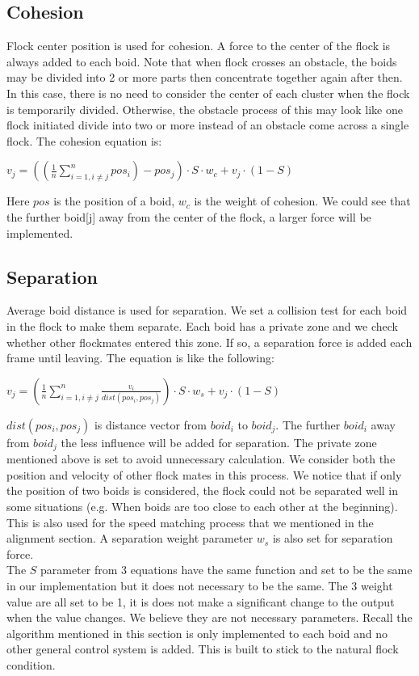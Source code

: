 \subsection{Cohesion}
Flock center position is used for cohesion. A force to the center of the flock is always added to each boid. Note that when flock crosses an obstacle, the boids may be divided into 2 or more parts then concentrate together again after then. In this case, there is no need to consider the center of each cluster when the flock is temporarily divided. Otherwise, the obstacle process of this may look like one flock initiated divide into two or more instead of an obstacle come across a single flock. The cohesion equation is:
\vspace{3mm}
\begin{center}
$v_j = ((\frac{1}{n}\sum_{i=1,i\neq{j}}^{n}{pos_i})-pos_j)\cdot S \cdot w_c + v_j \cdot (1-S)$
\end{center}
\vspace{3mm}
Here $pos$ is the position of a boid, $w_c$ is the weight of cohesion. We could see that the further boid[j] away from the center of the flock, a larger force will be implemented.

\subsection{Separation}
Average boid distance is used for separation. We set a collision test for each boid in the flock to make them separate. Each boid has a private zone and we check whether other flockmates entered this zone. If so, a separation force is added each frame until leaving. The equation is like the following:
\vspace{3mm}
\begin{center}
$v_j = (\frac{1}{n}\sum_{i=1,i\neq{j}}^{n}{\frac{v_i}{dist(pos_i,pos_j)}})\cdot S \cdot w_s + v_j \cdot (1-S)$
\end{center}
\vspace{3mm}
$dist(pos_i,pos_j)$ is distance vector from $boid_i$ to $boid_j$. The further $boid_i$ away from $boid_j$ the less influence will be added for separation. The private zone mentioned above is set to avoid unnecessary calculation. We consider both the position and velocity of other flock mates in this process. We notice that if only the position of two boids is considered, the flock could not be separated well in some situations (e.g. When boids are too close to each other at the beginning). This is also used for the speed matching process that we mentioned in the alignment section. A separation weight parameter $w_s$ is also set for separation force.\break
\\
The $S$ parameter from 3 equations have the same function and set to be the same in our implementation but it does not necessary to be the same. The 3 weight value are all set to be 1, it is does not make a significant change to the output when the value changes. We believe they are not necessary parameters. Recall the algorithm mentioned in this section is only implemented to each boid and no other general control system is added. This is built to stick to the natural flock condition.